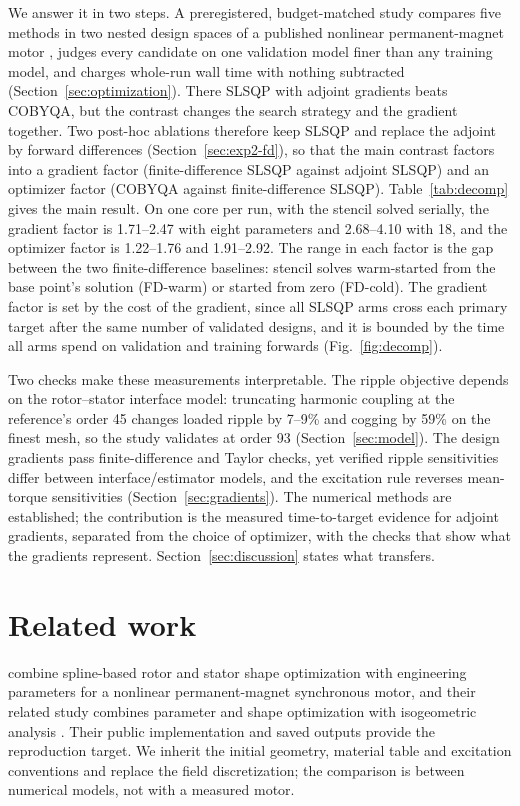 \documentclass{anvil-paper}
\begin{document}
We answer it in two steps. A preregistered, budget-matched study compares
five methods in two nested design spaces of a published nonlinear
permanent-magnet motor \citep{wiesheu2024spline}, judges every candidate
on one validation model finer than any training model, and charges
whole-run wall time with nothing subtracted (Section~\ref{sec:optimization}).
There SLSQP with adjoint gradients beats COBYQA, but the contrast changes
the search strategy and the gradient together. Two post-hoc ablations
therefore keep SLSQP and replace the adjoint by forward differences
(Section~\ref{sec:exp2-fd}), so that the main contrast factors into a
gradient factor (finite-difference SLSQP against adjoint SLSQP) and an
optimizer factor (COBYQA against finite-difference SLSQP).
Table~\ref{tab:decomp} gives the main result. On one core per run, with the
stencil solved serially, the gradient factor is 1.71--2.47 with eight
parameters and 2.68--4.10 with 18, and the optimizer factor is
1.22--1.76 and 1.91--2.92. The range in each factor is the gap between the
two finite-difference baselines: stencil solves warm-started from the base
point's solution (FD-warm) or started from zero (FD-cold). The gradient
factor is set by the cost of the gradient, since all SLSQP arms cross each
primary target after the same number of validated designs, and it is
bounded by the time all arms spend on validation and training forwards
(Fig.~\ref{fig:decomp}).

Two checks make these measurements interpretable. The ripple objective
depends on the rotor--stator interface model: truncating harmonic coupling
at the reference's order 45 changes loaded ripple by 7--9\% and cogging by
59\% on the finest mesh, so the study validates at order 93
(Section~\ref{sec:model}). The design gradients pass finite-difference and
Taylor checks, yet verified ripple sensitivities differ between
interface/estimator models, and the excitation rule reverses mean-torque
sensitivities (Section~\ref{sec:gradients}). The numerical methods are
established; the contribution is the measured time-to-target evidence for
adjoint gradients, separated from the choice of optimizer, with the checks
that show what the gradients represent. Section~\ref{sec:discussion} states
what transfers.

\section{Related work}
\citet{wiesheu2024spline} combine spline-based rotor and stator shape
optimization with engineering parameters for a nonlinear permanent-magnet
synchronous motor, and their related study combines parameter and shape
optimization with isogeometric analysis \citep{wiesheu2025combined}. Their
public implementation and saved outputs provide the reproduction target.
We inherit the initial geometry, material table and excitation
conventions and replace the field discretization; the comparison is
between numerical models, not with a measured motor.
\end{document}
